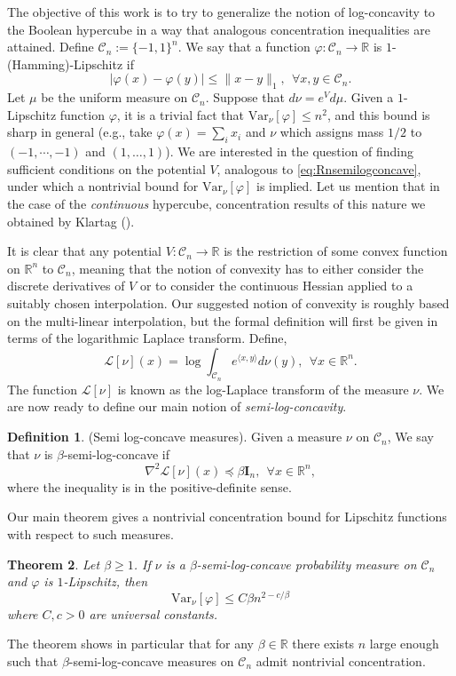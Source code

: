 \documentclass[12pt]{article}
\def \RR {\mathbb R}
\def \Var {\mathrm{Var}}
\def \DC {\mathcal{C}_n}
\def \Id {\mathbf{I}_n}
\newtheorem{theorem}{Theorem}
\theoremstyle{definition}
\newtheorem{definition}[theorem]{Definition}
\theoremstyle{remark}
\begin{document}
The objective of this work is to try to generalize the notion of log-concavity to the Boolean hypercube in a way that analogous concentration inequalities are attained. Define $\DC := \{-1,1\}^n$. We say that a function $\varphi:\DC \to \RR$ is $1$-(Hamming)-Lipschitz if
$$
|\varphi(x) - \varphi(y)| \leq \|x-y\|_1, ~~ \forall x,y \in \DC.
$$
Let $\mu$ be the uniform measure on $\DC$. Suppose that $d \nu = e^V d \mu$. Given a $1$-Lipschitz function $\varphi$, it is a trivial fact that $\Var_\nu[\varphi] \leq n^2$, and this bound is sharp in general (e.g., take $\varphi(x) = \sum_i x_i$ and $\nu$ which assigns mass $1/2$ to $(-1,\cdots,-1)$ and $(1,\dots,1)$). We are interested in the question of finding sufficient conditions on the potential $V$, analogous to \eqref{eq:Rnsemilogconcave}, under which a nontrivial bound for $\Var_\nu[\varphi]$ is implied. Let us mention that in the case of the \emph{continuous} hypercube, concentration results of this nature we obtained by Klartag (\cite{Klartag-cube}).

It is clear that any potential $V: \DC \to \RR$ is the restriction of some convex function on $\RR^n$ to $\DC$, meaning that the notion of convexity has to either consider the discrete derivatives of $V$ or to consider the continuous Hessian applied to a suitably chosen interpolation. Our suggested notion of convexity is roughly based on the multi-linear interpolation, but the formal definition will first be given in terms of the logarithmic Laplace transform. Define,
$$
\mathcal{L}[\nu](x) = \log \int_{\DC} e^{\langle x, y \rangle} d \nu(y), ~~ \forall x \in \RR^n.
$$
The function $\mathcal{L}[\nu]$ is known as the log-Laplace transform of the measure $\nu$. We are now ready to define our main notion of \emph{semi-log-concavity}.
\begin{definition} (Semi log-concave measures).
Given a measure $\nu$ on $\DC$, We say that $\nu$ is $\beta$-semi-log-concave if
\begin{equation}\label{eq:semilc}
\nabla^2 \mathcal{L}[\nu](x) \preceq \beta \Id, ~~ \forall x \in \RR^n,
\end{equation}
where the inequality is in the positive-definite sense.
\end{definition}

Our main theorem gives a nontrivial concentration bound for Lipschitz functions with respect to such measures.
\begin{theorem} \label{thm:main}
	Let $\beta \geq 1$. If $\nu$ is a $\beta$-semi-log-concave probability measure on $\DC$ and $\varphi$ is $1$-Lipschitz, then
	$$
	\Var_\nu[\varphi] \leq C \beta n^{2 - c/\beta} 
	$$
	where $C,c>0$ are universal constants.
\end{theorem}
The theorem shows in particular that for any $\beta \in \RR$ there exists $n$ large enough such that $\beta$-semi-log-concave measures on $\DC$ admit nontrivial concentration. \\
\end{document}
